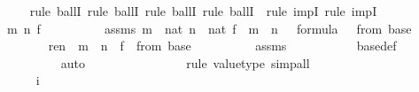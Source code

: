 \begin{isabellebody}
\ \ \ \ \isamarkupfalse%
{\isacharparenleft}{\kern0pt}rule\ ballI{\isacharcomma}{\kern0pt}\ rule\ ballI{\isacharcomma}{\kern0pt}\ rule\ ballI{\isacharcomma}{\kern0pt}\ rule\ ballI\ {\isacharcomma}{\kern0pt}\ rule\ impI{\isacharcomma}{\kern0pt}\ rule\ impI{\isacharparenright}{\kern0pt}\isanewline
\ \ \ \ \ \ \isamarkupfalse%
\ m\ n\ f\ {\isasymphi}\ \isanewline
\ \ \ \ \ \ \isamarkupfalse%
\ assms{}{\isacharcolon}{\kern0pt}\ {\isachardoublequoteopen}m\ {\isasymin}\ nat{\isachardoublequoteclose}\ {\isachardoublequoteopen}n\ {\isasymin}\ nat{\isachardoublequoteclose}\ {\isachardoublequoteopen}f\ {\isasymin}\ m\ {\isasymrightarrow}\ n{\isachardoublequoteclose}\ {\isachardoublequoteopen}{\isasymphi}\ {\isasymin}\ formula{\isachardoublequoteclose}\ {\isachardoublequoteopen}{\isasymphi}\ {\isasymin}\ {\isasymDelta}{}{\isacharunderscore}{\kern0pt}from{\isacharcircum}{\kern0pt}{}\ {\isacharparenleft}{\kern0pt}{\isasymDelta}{}{\isacharunderscore}{\kern0pt}base{\isacharparenright}{\kern0pt}{\isachardoublequoteclose}\ \isanewline
\ \ \ \ \ \ \isamarkupfalse%
\ {\isachardoublequoteopen}ren{\isacharparenleft}{\kern0pt}{\isasymphi}{\isacharparenright}{\kern0pt}\ {\isacharbackquote}{\kern0pt}\ m\ {\isacharbackquote}{\kern0pt}\ n\ {\isacharbackquote}{\kern0pt}\ f\ {\isasymin}\ {\isasymDelta}{}{\isacharunderscore}{\kern0pt}from{\isacharcircum}{\kern0pt}{}\ {\isacharparenleft}{\kern0pt}{\isasymDelta}{}{\isacharunderscore}{\kern0pt}base{\isacharparenright}{\kern0pt}{\isachardoublequoteclose}\isanewline
\ \ \ \ \ \ \ \ \isamarkupfalse%
\ assms{}\ \isanewline
\ \ \ \ \ \ \ \ \isamarkupfalse%
\ {\isasymDelta}{}{\isacharunderscore}{\kern0pt}base{\isacharunderscore}{\kern0pt}def\isanewline
\ \ \ \ \ \ \ \ \isamarkupfalse%
\ auto\isanewline
\ \ \ \ \ \ \ \ \ \ \ \ \ \ \ \isamarkupfalse%
{\isacharparenleft}{\kern0pt}rule\ value{\isacharunderscore}{\kern0pt}type{\isacharcomma}{\kern0pt}\ simp{\isacharunderscore}{\kern0pt}all{\isacharparenright}{\kern0pt}{\isacharplus}{\kern0pt}\isanewline
\ \ \ \ \ \ \ \ \isamarkupfalse%
\isanewline
\ \ \ \ \isamarkupfalse%
\isanewline
\ \ \isamarkupfalse%
\ \isanewline
\ \ \ \ \isamarkupfalse%
\ i\ \isanewline
\ \ \ \ \isamarkupfalse%

\end{isabellebody}
